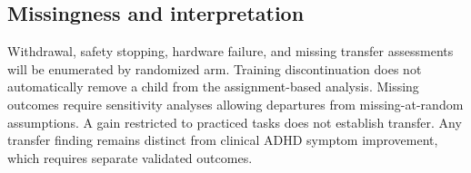 \subsection{Missingness and interpretation}
Withdrawal, safety stopping, hardware failure, and missing transfer assessments will be enumerated by randomized arm. Training discontinuation does not automatically remove a child from the assignment-based analysis. Missing outcomes require sensitivity analyses allowing departures from missing-at-random assumptions. A gain restricted to practiced tasks does not establish transfer. Any transfer finding remains distinct from clinical ADHD symptom improvement, which requires separate validated outcomes.